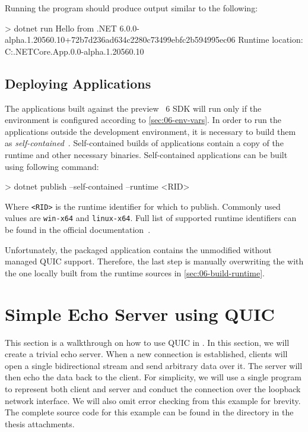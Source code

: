 Running the program should produce output similar to the following:

\noindent\begin{minipage}{\textwidth}
\begin{myVerbatim}
> dotnet run
Hello from .NET 6.0.0-alpha.1.20560.10+72b7d236ad634c2280c73499ebfc2b594995ec06
Runtime location: C:\dotnet\shared\Microsoft.NETCore.App\6.0.0-alpha.1.20560.10
\end{myVerbatim}
\end{minipage}

\subsection{Deploying \dotnet{} Applications}

The applications built against the preview \dotnet{}~6 SDK will run only if the environment is
configured according to \autoref{sec:06-env-vars}. In order to run the applications outside the
development environment, it is necessary to build them as
\textit{self-contained}~\cite{SelfContainedPublishDocs}. Self-contained builds of \dotnet{}
applications contain a copy of the \dotnet{} runtime and other necessary binaries. Self-contained
applications can be built using following command:

\begin{myVerbatim}
> dotnet publish --self-contained --runtime <RID>
\end{myVerbatim}

Where \texttt{<RID>} is the runtime identifier for which to publish. Commonly used values are
\texttt{win-x64} and \texttt{linux-x64}. Full list of supported runtime identifiers can be found in
the official \dotnet{} documentation~\cite{dotnetRIDs}.

Unfortunately, the packaged application contains the unmodified \SystemNetQuicDll{} without managed
QUIC support. Therefore, the last step is manually overwriting the \SystemNetQuicDll{} with the one
locally built from the \dotnet{} runtime sources in \autoref{sec:06-build-runtime}.

\section{Simple Echo Server using QUIC}\label{sec:06tutorial}

This section is a walkthrough on how to use QUIC in \dotnet{}. In this section, we will create a
trivial echo server. When a new connection is established, clients will open a single bidirectional
stream and send arbitrary data over it. The server will then echo the data back to the client. For
simplicity, we will use a single \dotnet{} program to represent both client and server and conduct
the connection over the loopback network interface. We will also omit error checking from this
example for brevity. The complete source code for this example can be found in the
 directory in the thesis attachments.

